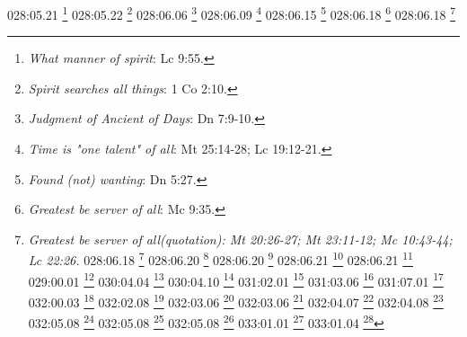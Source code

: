 {{{{{{{{{{{{{{{{{{{028:05.21 \footnote{\textit{What manner of spirit}: Lc 9:55.}
028:05.22 \footnote{\textit{Spirit searches all things}: 1 Co 2:10.}
028:06.06 \footnote{\textit{Judgment of Ancient of Days}: Dn 7:9-10.}
028:06.09 \footnote{\textit{Time is "one talent" of all}: Mt 25:14-28; Lc 19:12-21.}
028:06.15 \footnote{\textit{Found (not) wanting}: Dn 5:27.}
028:06.18 \footnote{\textit{Greatest be server of all}: Mc 9:35.}
028:06.18 \footnote{\textit{Greatest be server of all(quotation): Mt 20:26-27; Mt 23:11-12; Mc 10:43-44; Lc 22:26.}
028:06.18 \footnote{\textit{More blessed to giveMore blessed to give}: Hch 20:35.}
028:06.20 \footnote{\textit{# 1: Takes a city}: Pr 16:32.}
028:06.20 \footnote{\textit{Control tongue}: Pr 21:23; Stg 3:3-8.}
028:06.21 \footnote{\textit{God is good}: Sal 73:1.}
028:06.21 \footnote{\textit{God is great}: Job 36:26.}
029:00.01 \footnote{\textit{Physical creation}: Job 9:4-10; Job 26:7-14; Sal 8:3; Sal 33:6; Sal 104:2-9.}
030:04.04 \footnote{\textit{Led great multitude}: Mt 27:52; Ef 4:8.}
030:04.10 \footnote{\textit{Many mansions}: Jn 14:2.}
031:02.01 \footnote{\textit{Creator Sons create}: Heb 1:2,10.}
031:03.06 \footnote{\textit{Be you perfect}: Gn 17:1; 1 Re 8:61; Lv 19:2; Dt 18:13; Mt 5:48; 2 Co 13:11; Stg 1:4; 1 P 1:16.}
031:07.01 \footnote{\textit{Evangel of Light}: 2 Co 11:14.}
032:00.03 \footnote{\textit{Michael of Salvington}: Jn 1:1-3.}
032:02.08 \footnote{\textit{Man in God's image}: Gn 1:26-27; Gn 9:6.}
032:03.06 \footnote{\textit{Father & Son are one}: Jn 1:1; Jn 5:17-18; Jn 10:30,38; Jn 14:7-11,20; Jn 17:11,21-22.}
032:03.06 \footnote{\textit{See Son, see Father}: Jn 12:45; Jn 14:7-9.}
032:04.07 \footnote{\textit{Invisible God manifested}: Col 1:15-16; 1 Ti 1:17; Heb 11:27.}
032:04.08 \footnote{\textit{Lord knows his children}: 1 Re 8:39; 2 Cr 6:30; 2 Ti 2:19.}
032:05.08 \footnote{\textit{Certain victory}: 2 Ti 4:6-8.}
032:05.08 \footnote{\textit{Spirit of Truth}: Ez 11:19; Ez 18:31; Ez 36:26-27; Jl 2:28-29; Lc 24:49; Jn 7:39; Jn 14:16-18,23,26; Jn 15:4,26; Jn 16:7-8,13-14; Jn 17:21-23; Hch 1:5,8a; Hch 2:1-4,16-18; Hch 2:33; 2 Co 13:5; Gl 2:20; Gl 4:6; Ef 1:13; Ef 4:30; 1 Jn 4:12-15.}
032:05.08 \footnote{\textit{Whosoever will may come}: Sal 50:15; Jl 2:32; Zac 13:9; Mt 7:24; Mt 10:32-33; Mt 12:50; Mt 16:24-25; Mc 3:35; Mc 8:34-35; Lc 6:47; Lc 9:23-24; Lc 12:8; Jn 3:15-16; Jn 4:13-14; Jn 11:25-26; Jn 12:46; Hch 2:21; Hch 10:42-43; Hch 13:26; Ro 9:33; Ro 10:13; 1 Jn 2:23; 1 Jn 4:15; 1 Jn 5:1; Ap 22:17b.}
033:01.01 \footnote{\textit{Only begotten Son}: Sal 2:7; Jn 1:14,18; Jn 3:16,18; Hch 13:33; Heb 1:5; Heb 5:5; 1 Jn 4:9.}
033:01.04 \footnote{\textit{Father & Son are one}: Jn 1:1; Jn 5:17-18; Jn 10:30,38; Jn 14:7-11,20; Jn 17:11,21-22.}
}}}}}}}}}}}}}}}}}}}}
